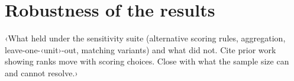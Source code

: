 \section{Robustness of the results}
\label{sec:robustness}
‹What held under the sensitivity suite (alternative scoring rules, aggregation, leave-one-‹unit›-out, matching variants) and what did not. Cite prior work showing ranks move with scoring choices. Close with what the sample size can and cannot resolve.›
